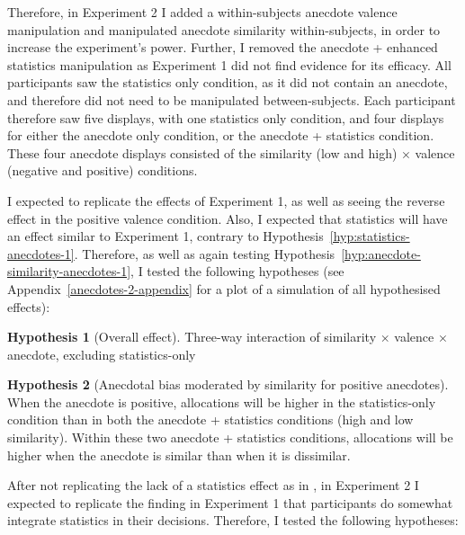\documentclass[a4paper, nobind, dvipsnames]{templates/ociamthesis}
\theoremstyle{definition}
\theoremstyle{definition}
\theoremstyle{definition}
\theoremstyle{definition}
\newtheorem{hypothesis}{Hypothesis}[chapter]
\theoremstyle{remark}
\begin{document}
Therefore, in Experiment 2 I added a within-subjects anecdote valence
manipulation and manipulated anecdote similarity within-subjects, in order to
increase the experiment's power. Further, I removed the anecdote + enhanced
statistics manipulation as Experiment 1 did not find evidence for its efficacy.
All participants saw the statistics only condition, as it did not contain an
anecdote, and therefore did not need to be manipulated between-subjects. Each
participant therefore saw five displays, with one statistics only condition, and
four displays for either the anecdote only condition, or the anecdote +
statistics condition. These four anecdote displays consisted of the similarity
(low and high) \(\times\) valence (negative and positive) conditions.

I expected to replicate the effects of Experiment 1, as well as seeing the
reverse effect in the positive valence condition. Also, I expected that
statistics will have an effect similar to Experiment 1, contrary to
Hypothesis~\ref{hyp:statistics-anecdotes-1}. Therefore, as well as again
testing Hypothesis~\ref{hyp:anecdote-similarity-anecdotes-1}, I tested the
following hypotheses (see Appendix~\ref{anecdotes-2-appendix} for a plot of a
simulation of all hypothesised effects):

\begin{hypothesis}[Overall effect]
\protect\hypertarget{hyp:three-way-anecdotes-2}{}{\label{hyp:three-way-anecdotes-2} {} }Three-way interaction of similarity \(\times\) valence \(\times\) anecdote,
excluding statistics-only
\end{hypothesis}

\begin{hypothesis}[Anecdotal bias moderated by similarity for positive anecdotes]
\protect\hypertarget{hyp:anecdote-similarity-anecdotes-2}{}{\label{hyp:anecdote-similarity-anecdotes-2} {} }When the anecdote is positive, allocations will be higher in the statistics-only
condition than in both the anecdote + statistics conditions (high and low
similarity). Within these two anecdote + statistics conditions, allocations will
be higher when the anecdote is similar than when it is dissimilar.
\end{hypothesis}

After not replicating the lack of a statistics effect as in \textcite{wainberg2013}, in
Experiment 2 I expected to replicate the finding in Experiment 1 that
participants do somewhat integrate statistics in their decisions. Therefore, I
tested the following hypotheses:
\end{document}
